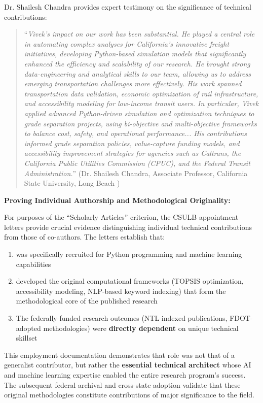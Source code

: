 Dr. Shailesh Chandra provides expert testimony on the significance of \drs technical contributions:

\begin{quote}
``\textit{Vivek’s impact on our work has been substantial. He played a central role in automating complex analyses for California’s innovative freight initiatives, developing Python-based simulation models that significantly enhanced the efficiency and scalability of our research. He brought strong data-engineering and analytical skills to our team, allowing us to address emerging transportation challenges more effectively. His work spanned transportation data validation, economic optimization of rail infrastructure, and accessibility modeling for low-income transit users. In particular, Vivek applied advanced Python-driven simulation and optimization techniques to grade separation projects, using bi-objective and multi-objective frameworks to balance cost, safety, and operational performance... His contributions informed grade separation policies, value-capture funding models, and accessibility improvement strategies for agencies such as Caltrans, the California Public Utilities Commission (CPUC), and the Federal Transit Administration.}'' (Dr. Shailesh Chandra, Associate Professor, California State University, Long Beach \cite{LOR1})
\end{quote}

\textbf{Proving Individual Authorship and Methodological Originality:}

For purposes of the ``Scholarly Articles'' criterion, the CSULB appointment letters provide crucial evidence distinguishing \drs individual technical contributions from those of co-authors. The letters establish that:

\begin{enumerate}
\item \dr was specifically recruited for Python programming and machine learning capabilities
\item \dr developed the original computational frameworks (TOPSIS optimization, accessibility modeling, NLP-based keyword indexing) that form the methodological core of the published research
\item The federally-funded research outcomes (NTL-indexed publications, FDOT-adopted methodologies) were \textbf{directly dependent} on \drs unique technical skillset
\end{enumerate}

This employment documentation demonstrates that \drs role was not that of a generalist contributor, but rather the \textbf{essential technical architect} whose AI and machine learning expertise enabled the entire research program's success. The subsequent federal archival and cross-state adoption validate that these original methodologies constitute contributions of major significance to the field.

